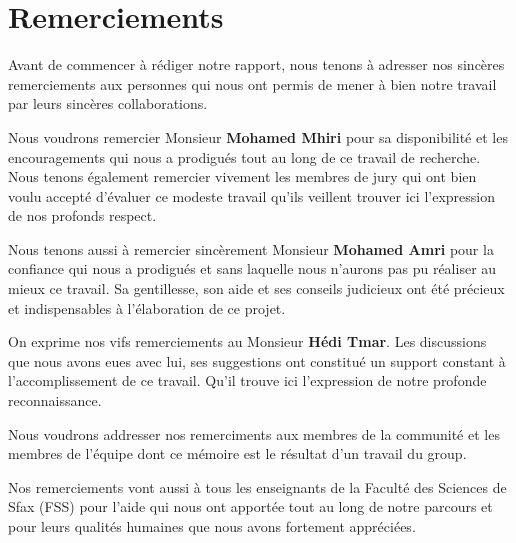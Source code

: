 \section*{Remerciements}

\vspace{0.9in}
\begin{center}

    Avant de commencer à rédiger notre rapport, nous tenons à adresser nos
    sincères remerciements aux personnes qui nous ont permis de mener à bien
    notre travail par leurs sincères collaborations.

    Nous voudrons remercier Monsieur \textbf{Mohamed Mhiri} pour sa
    disponibilité et les encouragements qui nous a prodigués tout au long de ce
    travail de recherche. Nous tenons également remercier vivement les membres
    de jury qui ont bien voulu accepté d'évaluer ce modeste travail qu'ils
    veillent trouver ici l'expression de nos profonds respect.

    Nous tenons aussi à remercier sincèrement Monsieur \textbf{Mohamed Amri}
    pour la confiance qui nous a prodigués et sans laquelle nous n’aurons pas
    pu réaliser au mieux ce travail. Sa gentillesse, son aide et ses conseils
    judicieux ont été précieux et indispensables à l’élaboration de ce projet.

    On exprime nos vifs remerciements au Monsieur \textbf{Hédi Tmar}. Les
    discussions que nous avons eues avec lui, ses suggestions ont constitué un
    support constant à l’accomplissement de ce travail. Qu'il trouve ici
    l'expression de notre profonde reconnaissance.

    Nous voudrons addresser nos remerciments aux membres de la communité
    \textbf{} et les membres de l'équipe
    \textbf{} dont ce mémoire est le résultat d'un
    travail du group.

    Nos remerciements vont aussi à tous les enseignants de la Faculté des
    Sciences de Sfax (FSS) pour l’aide qui nous ont apportée tout au long de
    notre parcours et pour leurs qualités humaines que nous avons fortement
    appréciées.
\end{center}
